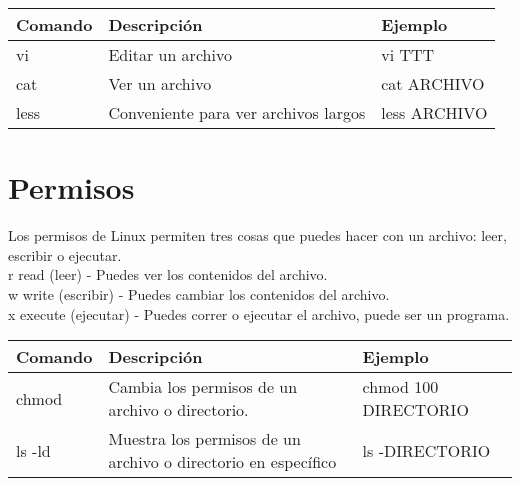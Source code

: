 \documentclass[12pt]{article}
\begin{document}
\begin{tabular}{|p{4cm}|p{6cm}|p{4cm}|}
\hline
Comando & Descripción & Ejemplo \\
\hline
vi & Editar un archivo & vi TTT \\ \hline
cat & Ver un archivo & cat ARCHIVO \\ \hline
less & Conveniente para ver archivos largos & less ARCHIVO \\ \hline
\end{tabular}

\section{Permisos}

Los permisos de Linux permiten tres cosas que puedes hacer con un archivo: leer,  escribir o ejecutar.\\

r read (leer) - Puedes ver los contenidos del archivo.\\
w write (escribir) - Puedes cambiar los contenidos del archivo.\\
x execute (ejecutar) - Puedes correr o ejecutar el archivo, puede ser un programa.\\

\begin{tabular}{|p{4cm}|p{6cm}|p{4cm}|}
\hline
Comando & Descripción & Ejemplo \\ \hline
chmod & Cambia los permisos de un archivo o directorio. & chmod 100 DIRECTORIO \\ \hline
ls -ld & Muestra los permisos de un archivo o directorio en específico & ls -DIRECTORIO \\ \hline
\end{tabular}
\end{document}
